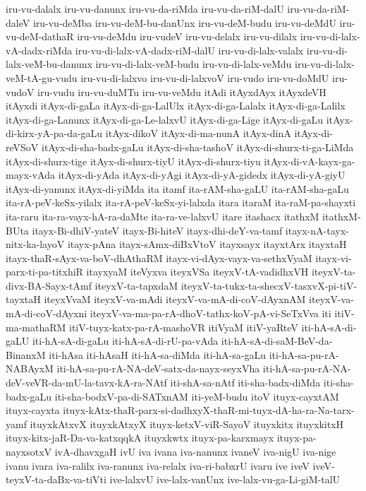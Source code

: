 {iru-vu-dalalx
iru-vu-danunx
iru-vu-da-riMda
iru-vu-da-riM-dalU
iru-vu-da-riM-daleV
iru-vu-deMba
iru-vu-deM-bu-danUnx
iru-vu-deM-budu
iru-vu-deMdU
iru-vu-deM-dathaR
iru-vu-deMdu
iru-vudeV
iru-vu-delalx
iru-vu-dilalx
iru-vu-di-lalx-vA-dadx-riMda
iru-vu-di-lalx-vA-dadx-riM-dalU
iru-vu-di-lalx-valalx
iru-vu-di-lalx-veM-bu-danunx
iru-vu-di-lalx-veM-budu
iru-vu-di-lalx-veMdu
iru-vu-di-lalx-veM-tA-gu-vudu
iru-vu-di-lalxvo
iru-vu-di-lalxvoV
iru-vudo
iru-vu-doMdU
iru-vudoV
iru-vudu
iru-vu-duMTu
iru-vu-veMdu
itAdi
itAyxdAyx
itAyxdeVH
itAyxdi
itAyx-di-gaLa
itAyx-di-ga-LalUlx
itAyx-di-ga-Lalalx
itAyx-di-ga-Lalilx
itAyx-di-ga-Lanunx
itAyx-di-ga-Le-lalxvU
itAyx-di-ga-Lige
itAyx-di-gaLu
itAyx-di-kirx-yA-pa-da-gaLu
itAyx-dikoV
itAyx-di-ma-nunA
itAyx-dinA
itAyx-di-reVSoV
itAyx-di-sha-badx-gaLu
itAyx-di-sha-tashoV
itAyx-di-shurx-ti-ga-LiMda
itAyx-di-shurx-tige
itAyx-di-shurx-tiyU
itAyx-di-shurx-tiyu
itAyx-di-vA-kayx-ga-mayx-vAda
itAyx-di-yAda
itAyx-di-yAgi
itAyx-di-yA-gidedx
itAyx-di-yA-giyU
itAyx-di-yanunx
itAyx-di-yiMda
ita
itamf
ita-rAM-sha-gaLU
ita-rAM-sha-gaLu
ita-rA-peV-keSx-yilalx
ita-rA-peV-keSx-yi-lalxda
itara
itaraM
ita-raM-pa-shayxti
ita-raru
ita-ra-vayx-hA-ra-daMte
ita-ra-ve-lalxvU
itare
itashacx
itathxM
itathxM-BUta
itayx-Bi-dhiV-yateV
itayx-Bi-hiteV
itayx-dhi-deY-va-tamf
itayx-nA-tayx-nitx-ka-layoV
itayx-pAna
itayx-sAmx-diBxVtoV
itayxsayx
itayxtArx
itayxtaH
itayx-thaR-sAyx-va-boV-dhAthaRM
itayx-vi-dAyx-vayx-va-sethxVyaM
itayx-vi-parx-ti-pa-titxhiR
itayxyaM
iteVyxva
iteyxVSa
iteyxV-tA-vadidhxVH
iteyxV-ta-divx-BA-Sayx-tAmf
iteyxV-ta-tapxdaM
iteyxV-ta-tukx-ta-shecxV-tasxvX-pi-tiV-tayxtaH
iteyxVvaM
iteyxV-va-mAdi
iteyxV-va-mA-di-coV-dAyxnAM
iteyxV-va-mA-di-coV-dAyxni
iteyxV-va-ma-pa-rA-dhoV-tathx-koV-pA-vi-SeTxVva
iti
itiV-ma-mathaRM
itiV-tuyx-katx-pa-rA-mashoVR
itiVyaM
itiV-yaRteV
iti-hA-sA-di-gaLU
iti-hA-sA-di-gaLu
iti-hA-sA-di-rU-pa-vAda
iti-hA-sA-di-saM-BeV-da-BinanxM
iti-hAsa
iti-hAsaH
iti-hA-sa-diMda
iti-hA-sa-gaLu
iti-hA-sa-pu-rA-NABAyxM
iti-hA-sa-pu-rA-NA-deV-satx-da-nayx-seyxVha
iti-hA-sa-pu-rA-NA-deV-veVR-da-mU-la-tavx-kA-ra-NAtf
iti-shA-sa-nAtf
iti-sha-badx-diMda
iti-sha-badx-gaLu
iti-sha-bodxV-pa-di-SATxnAM
iti-yeM-budu
itoV
ituyx-cayxtAM
ituyx-cayxta
ituyx-kAtx-thaR-parx-si-dadhxyX-thaR-mi-tuyx-dA-ha-ra-Na-tarx-yamf
ituyxkAtxvX
ituyxkAtxyX
ituyx-ketxV-viR-SayoV
ituyxkitx
ituyxkitxH
ituyx-kitx-jaR-Da-va-katxqqkA
ituyxkwtx
ituyx-pa-karxmayx
ituyx-pa-nayxsotxV
ivA-dhavxgaH
ivU
iva
ivana
iva-nanunx
ivaneV
iva-nigU
iva-nige
ivanu
ivara
iva-ralilx
iva-ranunx
iva-relalx
iva-ri-babxrU
ivaru
ive
iveV
iveV-teyxV-ta-daBx-va-tiVti
ive-lalxvU
ive-lalx-vanUnx
ive-lalx-vu-ga-Li-giM-talU
}
